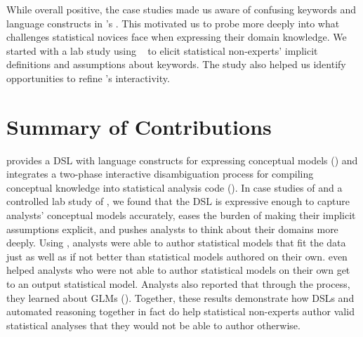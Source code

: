 While overall positive, the case studies made us aware of confusing keywords and
language constructs in \tisane's \SDSL. This motivated us to probe more deeply
into what challenges statistical novices face when expressing their domain
knowledge. We started with a lab study using \tisane~\cite{jun2022tisane} to
elicit statistical non-experts' implicit definitions and assumptions about \SDSL
keywords. The study also helped us identify opportunities to refine \tisane's
interactivity.









\section{Summary of Contributions}


\rTisane provides a DSL with language constructs for expressing conceptual
models (\thesisChallengeExplicit) and integrates a two-phase interactive
disambiguation process for compiling conceptual knowledge into statistical
analysis code (\thesisChallengeRep). In case studies of \tisane and a controlled
lab study of \rTisane, we found that the DSL is expressive enough to capture
analysts' conceptual models accurately, eases the burden of making their
implicit assumptions explicit, and pushes analysts to think about their domains
more deeply. Using \rTisane, analysts were able to author statistical models
that fit the data just as well as if not better than statistical models authored
on their own. \rTisane even helped analysts who were not able to author
statistical models on their own get to an output statistical model. Analysts
also reported that through the process, they learned about GLMs
(\thesisChallengeUnderstanding). Together, these results demonstrate how DSLs and
automated reasoning together in fact do help statistical non-experts author
valid statistical analyses that they would not be able to author otherwise.

